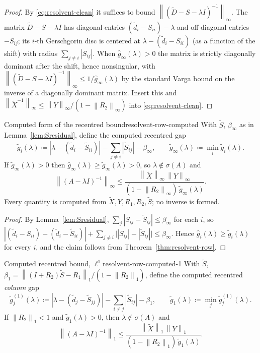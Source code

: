 \documentclass[11pt, a4paper]{article}
\numberwithin{equation}{section}
\newcommand{\norm}[1]{\left\|#1\right\|}
\newcommand{\abs}[1]{\left|#1\right|}
\newcommand{\tX}{\widetilde{X}}
\newcommand{\tD}{\widetilde{D}}
\begin{document}
\begin{proof}
By \eqref{eq:resolvent-clean} it suffices to bound $\norm{(\tD - S - \lambda
I)^{-1}}_\infty$.  The matrix $\tD - S - \lambda I$ has diagonal entries
$(\tilde d_i - S_{ii}) - \lambda$ and off-diagonal entries $-S_{ij}$; its
$i$-th Gerschgorin disc is centered at $\lambda - (\tilde d_i - S_{ii})$ (as a
function of the shift) with radius $\sum_{j\ne i}\abs{S_{ij}}$.  When $\hat
g_\infty(\lambda) > 0$ the matrix is strictly diagonally dominant after the
shift, hence nonsingular, with $\norm{(\tD - S - \lambda I)^{-1}}_\infty \le
1/\hat g_\infty(\lambda)$ by the standard Varga bound on the inverse of a
diagonally dominant matrix.  Insert this and $\norm{\tX^{-1}}_\infty \le
\norm{Y}_\infty/(1 - \norm{R_2}_\infty)$ into \eqref{eq:resolvent-clean}.
\end{proof}

\begin{corollary}{Computed form of the recentred bound}{resolvent-row-computed}
  With $\tilde S$, $\beta_\infty$ as in Lemma~\ref{lem:Sresidual}, define the
  computed recentred gap
  \[
    \tilde g_i(\lambda) \coloneqq \abs{\lambda - (\tilde d_i - \tilde S_{ii})}
      - \sum_{j\ne i}\abs{\tilde S_{ij}} - \beta_\infty,
    \qquad
    \tilde g_\infty(\lambda) \coloneqq \min_i \tilde g_i(\lambda).
  \]
  If $\tilde g_\infty(\lambda) > 0$ then $\hat g_\infty(\lambda) \ge \tilde
  g_\infty(\lambda) > 0$, so $\lambda \notin \sigma(A)$ and
  \[
    \norm{(A - \lambda I)^{-1}}_\infty
      \le \frac{\norm{\tX}_\infty\,\norm{Y}_\infty}
               {(1 - \norm{R_2}_\infty)\,\tilde g_\infty(\lambda)}.
  \]
  Every quantity is computed from $\tX, Y, R_1, R_2, \tilde S$; no inverse is
  formed.
\end{corollary}

\begin{proof}
By Lemma~\ref{lem:Sresidual}, $\sum_j\abs{S_{ij} - \tilde S_{ij}} \le
\beta_\infty$ for each $i$, so $\abs{(\tilde d_i - S_{ii}) - (\tilde d_i -
\tilde S_{ii})} + \sum_{j\ne i}\bigl|\abs{S_{ij}} - \abs{\tilde
S_{ij}}\bigr| \le \beta_\infty$.  Hence $\hat g_i(\lambda) \ge \tilde
g_i(\lambda)$ for every $i$, and the claim follows from
Theorem~\ref{thm:resolvent-row}.
\end{proof}

\begin{corollary}{Computed recentred bound, $\ell^1$}{resolvent-row-computed-1}
  With $\tilde S$, $\beta_1 = \norm{(I+R_2)\tilde S - R_1}_1/(1 - \norm{R_2}_1)$,
  define the computed recentred \emph{column} gap
  \[
    \tilde g^{(1)}_j(\lambda) \coloneqq \abs{\lambda - (\tilde d_j - \tilde S_{jj})}
      - \sum_{i\ne j}\abs{\tilde S_{ij}} - \beta_1,
    \qquad
    \tilde g_1(\lambda) \coloneqq \min_j \tilde g^{(1)}_j(\lambda).
  \]
  If $\norm{R_2}_1 < 1$ and $\tilde g_1(\lambda) > 0$, then $\lambda \notin
  \sigma(A)$ and
  \[
    \norm{(A - \lambda I)^{-1}}_1
      \le \frac{\norm{\tX}_1\,\norm{Y}_1}
               {(1 - \norm{R_2}_1)\,\tilde g_1(\lambda)}.
  \]
\end{corollary}
\end{document}
